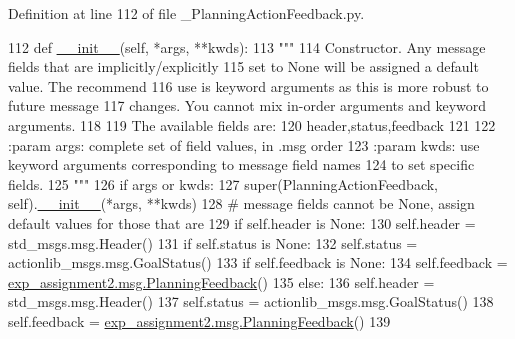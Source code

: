 Definition at line 112 of file \+\_\+\+Planning\+Action\+Feedback.\+py.


\begin{DoxyCode}
112   \textcolor{keyword}{def }\hyperlink{classstate__machine_1_1Play_a5993a23d8be7f7b2647f71ede0334957}{\_\_init\_\_}(self, *args, **kwds):
113     \textcolor{stringliteral}{"""}
114 \textcolor{stringliteral}{    Constructor. Any message fields that are implicitly/explicitly}
115 \textcolor{stringliteral}{    set to None will be assigned a default value. The recommend}
116 \textcolor{stringliteral}{    use is keyword arguments as this is more robust to future message}
117 \textcolor{stringliteral}{    changes.  You cannot mix in-order arguments and keyword arguments.}
118 \textcolor{stringliteral}{}
119 \textcolor{stringliteral}{    The available fields are:}
120 \textcolor{stringliteral}{       header,status,feedback}
121 \textcolor{stringliteral}{}
122 \textcolor{stringliteral}{    :param args: complete set of field values, in .msg order}
123 \textcolor{stringliteral}{    :param kwds: use keyword arguments corresponding to message field names}
124 \textcolor{stringliteral}{    to set specific fields.}
125 \textcolor{stringliteral}{    """}
126     \textcolor{keywordflow}{if} args \textcolor{keywordflow}{or} kwds:
127       super(PlanningActionFeedback, self).\hyperlink{classstate__machine_1_1Play_a5993a23d8be7f7b2647f71ede0334957}{\_\_init\_\_}(*args, **kwds)
128       \textcolor{comment}{# message fields cannot be None, assign default values for those that are}
129       \textcolor{keywordflow}{if} self.header \textcolor{keywordflow}{is} \textcolor{keywordtype}{None}:
130         self.header = std\_msgs.msg.Header()
131       \textcolor{keywordflow}{if} self.status \textcolor{keywordflow}{is} \textcolor{keywordtype}{None}:
132         self.status = actionlib\_msgs.msg.GoalStatus()
133       \textcolor{keywordflow}{if} self.feedback \textcolor{keywordflow}{is} \textcolor{keywordtype}{None}:
134         self.feedback = \hyperlink{classexp__assignment2_1_1msg_1_1__PlanningFeedback_1_1PlanningFeedback}{exp\_assignment2.msg.PlanningFeedback}()
135     \textcolor{keywordflow}{else}:
136       self.header = std\_msgs.msg.Header()
137       self.status = actionlib\_msgs.msg.GoalStatus()
138       self.feedback = \hyperlink{classexp__assignment2_1_1msg_1_1__PlanningFeedback_1_1PlanningFeedback}{exp\_assignment2.msg.PlanningFeedback}()
139 
\end{DoxyCode}


